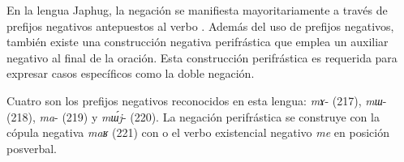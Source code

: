 En la lengua Japhug, la negación se manifiesta mayoritariamente a través de prefijos negativos antepuestos al verbo \textcolor{MidnightBlue}{\citep{japhug}}. Además del uso de prefijos negativos, también existe una construcción negativa perifrástica que emplea un auxiliar negativo al final de la oración. Esta construcción perifrástica es requerida para expresar casos específicos como la doble negación.

Cuatro son los prefijos negativos reconocidos en esta lengua: {\setmainfont{Charis SIL} \textit{mɤ}}- (217), {\setmainfont{Charis SIL} \textit{mɯ}}- (218), {\setmainfont{Charis SIL} \textit{ma}}- (219) y {\setmainfont{Charis SIL} \textit{mɯ́j}}- (220). La negación perifrástica se construye con la cópula negativa {\setmainfont{Charis SIL} \textit{maʁ}} (221) con o el verbo existencial negativo {\setmainfont{Charis SIL} \textit{me}} en posición posverbal.
